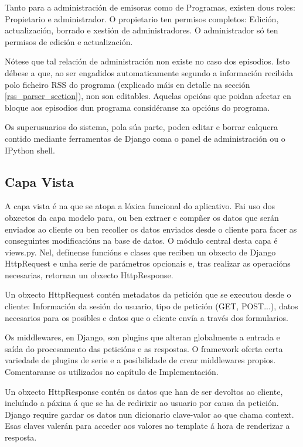 Tanto para a administración de emisoras como de Programas, existen dous roles: Propietario e administrador. O propietario ten permisos completos: Edición, actualización, borrado e xestión de administradores. O administrador só ten permisos de edición e actualización.  

Nótese que tal relación de administración non existe no caso dos episodios. Isto débese a que, ao ser engadidos automaticamente segundo a información recibida polo ficheiro RSS do programa (explicado máis en detalle na sección \ref{rss_parser_section}), non son editables. Aquelas opcións que poidan afectar en bloque aos episodios dun programa considéranse xa opcións do programa.

Os superusuarios do sistema, pola súa parte, poden editar e borrar calquera contido mediante ferramentas de Django coma o panel de administración ou o IPython shell.


\subsection{Capa Vista}

A capa vista é na que se atopa a lóxica funcional do aplicativo. Fai uso dos obxectos da capa modelo para, ou ben extraer e compñer os datos que serán enviados ao cliente ou ben recoller os datos enviados desde o cliente para facer as conseguintes modificacións na base de datos. O módulo central desta capa é views.py. Nel, defínense funcións e clases que reciben un obxecto de Django HttpRequest e unha serie de parámetros opcionais e, tras realizar as operacións necesarias, retornan un obxecto HttpResponse.

Un obxecto HttpRequest contén metadatos da petición que se executou desde o cliente: Información da sesión do usuario, tipo de petición (GET, POST...), datos necesarios para os posibles  e datos que o cliente envía a través dos formularios. 

Os middlewares, en Django, son plugins que alteran globalmente a entrada e saída do procesamento das peticións e as respostas. O framework oferta certa variedade de plugins de serie e a posibilidade de crear middlewares propios. Comentaranse os utilizados no capítulo de Implementación.

Un obxecto HttpResponse contén os datos que han de ser devoltos ao cliente, incluíndo a páxina á que se ha de redirixir ao usuario por causa da petición. Django require gardar os datos nun dicionario clave-valor ao que chama context. Esas claves valerán para acceder aos valores no template á hora de renderizar a resposta.

